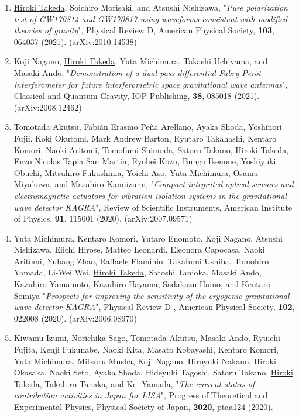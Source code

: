 \documentclass[uplatex, 11pt]{jsarticle}
\begin{document}
\begin{enumerate}
   \item \uline{Hiroki Takeda}, Soichiro Morisaki, and Atsushi Nishizawa, "\emph{Pure polarization test of GW170814 and GW170817 using waveforms consistent with modified theories of gravity}", Physical Review D, American Physical Society, {\bf 103}, 064037 (2021). (arXiv:2010.14538)\\
   
   \item Koji Nagano, \uline{Hiroki Takeda}, Yuta Michimura, Takashi Uchiyama, and Masaki Ando, "\emph{Demonstration of a dual-pass differential Fabry-Perot interferometer for future interferometric space gravitational wave antennas}", Classical and Quantum Gravity, IOP Publishing, {\bf 38}, 085018 (2021). (arXiv:2008.12462)\\
  
\item Tomotada Akutsu, Fabián Erasmo Peña Arellano, Ayaka Shoda, Yoshinori Fujii, Koki Okutomi, Mark Andrew Barton, Ryutaro Takahashi, Kentaro Komori, Naoki Aritomi, Tomofumi Shimoda, Satoru Takano, \uline{Hiroki Takeda}, Enzo Nicolas Tapia San Martin, Ryohei Kozu, Bungo Ikenoue, Yoshiyuki Obuchi, Mitsuhiro Fukushima, Yoichi Aso, Yuta Michimura, Osamu Miyakawa, and Masahiro Kamiizumi, "\emph{Compact integrated optical sensors and electromagnetic actuators for vibration isolation systems in the gravitational-wave detector KAGRA}", Review of Scientific Instruments, American Institute of Physics, {\bf 91}, 115001 (2020). (arXiv:2007.09571)\\

\item Yuta Michimura, Kentaro Komori, Yutaro Enomoto, Koji Nagano, Atsushi Nishizawa, Eiichi Hirose, Matteo Leonardi, Eleonora Capocasa, Naoki Aritomi, Yuhang Zhao, Raffaele Flaminio, Takafumi Ushiba, Tomohiro Yamada, Li-Wei Wei, \uline{Hiroki Takeda}, Satoshi Tanioka, Masaki Ando, Kazuhiro Yamamoto, Kazuhiro Hayama, Sadakazu Haino, and Kentaro Somiya "\emph{Prospects for improving the sensitivity of the cryogenic gravitational wave detector KAGRA}", Physical Review D , American Physical Society, {\bf 102}, 022008 (2020). (arXiv:2006.08970)\\

\item Kiwamu Izumi, Norichika Sago, Tomotada Akutsu, Masaki Ando, Ryuichi Fujita, Kenji Fukunabe, Naoki Kita, Masato Kobayashi, Kentaro Komori, Yuta Michimura, Mitsuru Musha, Koji Nagano, Hiroyuki Nakano, Hiroki Okasaka, Naoki Seto, Ayaka Shoda, Hideyuki Tagoshi, Satoru Takano, \uline{Hiroki Takeda}, Takahiro Tanaka, and Kei Yamada, "\emph{The current status of contribution activities in Japan for LISA}", Progress of Theoretical and Experimental Physics, Physical Society of Japan, {\bf 2020}, ptaa124 (2020).\\


\end{enumerate}
\end{document}
